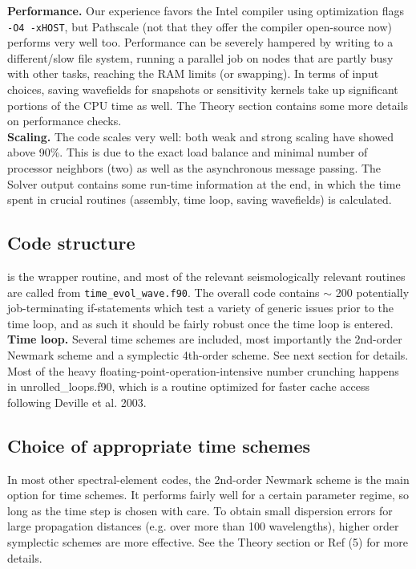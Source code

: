 \documentclass[11pt,letter,fleqn,english,notitlepage]{article}
\begin{document}
\noindent \textbf{Performance.} Our experience favors the Intel compiler using optimization flags {\tt -O4 -xHOST}, but 
Pathscale (not that they offer the compiler open-source now) performs very well too.
Performance can be severely hampered by writing to a different/slow file system, running a parallel job on nodes that 
are partly busy with other tasks, reaching the RAM limits (or swapping). In terms of input choices, saving wavefields 
for snapshots or sensitivity kernels take up significant portions of the CPU time as well. The Theory section contains 
some more details on performance checks.\\

\noindent \textbf{Scaling.} The code scales very well: both weak and strong scaling have showed above 90\%. 
This is due to the exact load balance and minimal number of processor neighbors (two) as well as the asynchronous 
message passing. The Solver output contains some run-time information at the end, in which the time spent in 
crucial routines (assembly, time loop, saving wavefields) is calculated. 

\subsection{Code structure}
 is  the wrapper routine, and most of the relevant seismologically relevant 
routines are called from {\tt time\_evol\_wave.f90}. The overall code contains $\sim$ 200 potentially 
job-terminating if-statements which test a variety of generic issues prior 
to the time loop, and as such it should be fairly robust once the time loop is entered. \\

\noindent \textbf{Time loop.} 
Several time schemes are included, most importantly the 2nd-order Newmark scheme and a symplectic 4th-order 
scheme. See next section for details.
Most of the heavy floating-point-operation-intensive number crunching happens in unrolled\_loops.f90, which 
is a routine optimized for faster cache access following Deville et al. 2003. 

\subsection{Choice of appropriate time schemes}
In most other spectral-element codes, the 2nd-order Newmark scheme is 
the main option for time schemes. It performs fairly well for a certain parameter regime, so long 
as the time step is chosen with care. To obtain small dispersion errors for large 
propagation distances (e.g. over more than 100 wavelengths), higher order symplectic 
schemes are more effective. See the Theory section or Ref (5) for more details.\\
\end{document}
